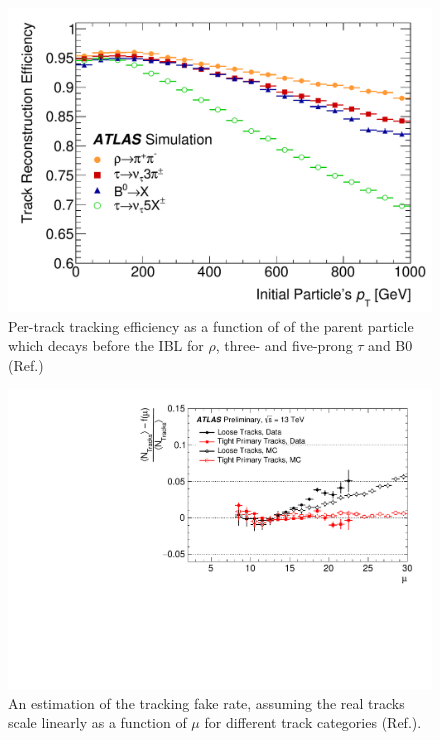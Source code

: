 \begin{figure}[htpb!]
\begin{center}
  \includegraphics[width=0.55\linewidth]{figures/Reco/TrackingEfficiency}
  \caption{Per-track tracking efficiency as a function of \pt of the parent particle which decays before the IBL for $\rho$, three- and five-prong $\tau$ and B0 (Ref.\cite{Aaboud:2017all})}
\label{fig:reco-trackingeff}
\end{center}
\end{figure}

\begin{figure}[htpb!]
\begin{center}
  \includegraphics[width=0.55\linewidth]{figures/Reco/TrackingFake}
\caption{An estimation of the tracking fake rate, assuming the real tracks scale linearly as a function of $\mu$ for different track categories (Ref.\cite{ATL-PHYS-PUB-2015-051}). }
\label{fig:reco-trackingfake}
\end{center}
\end{figure}

